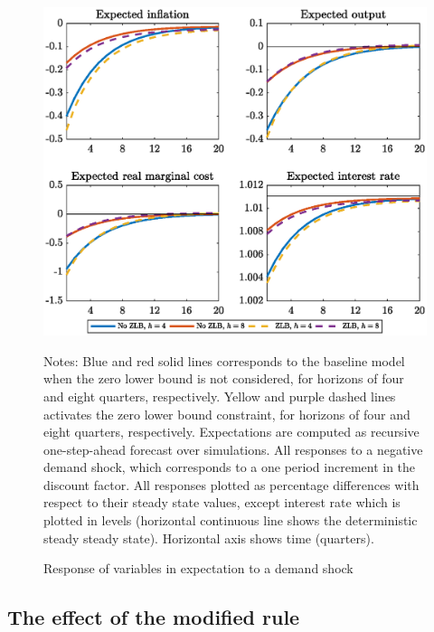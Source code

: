 \documentclass[11pt]{article}
\numberwithin{equation}{section}
\begin{document}
\begin{figure}[H]
	\centering
	\caption{Response of variables in expectation to a demand shock}\label{fig:irfExp_pref}
	\includegraphics[scale=.6]{irfExp_pref}
	\begin{minipage}{\linewidth}
    	\vspace{1mm}
	\footnotesize{{\sc Notes:} Blue and red solid lines corresponds to the baseline model when the zero lower bound is not considered, for horizons of four and eight quarters, respectively. Yellow and purple dashed lines activates the zero lower bound constraint, for horizons of four and eight quarters, respectively. Expectations are computed as recursive one-step-ahead forecast over simulations. All responses to a negative demand shock, which corresponds to a one period increment in the discount factor. All responses plotted as percentage differences with respect to their steady state values, except interest rate which is plotted in levels (horizontal continuous line shows the deterministic steady steady state). Horizontal axis shows time (quarters).}
	\end{minipage}
\end{figure}

\subsection{The effect of the modified rule}
\end{document}
